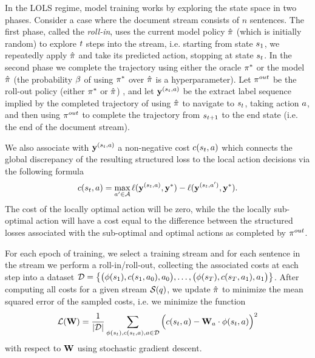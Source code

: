 In the LOLS regime, model training works by exploring the state space in 
two phases. Consider a case where the document stream consists of $n$ 
sentences. The first phase, called 
the \textit{roll-in}, uses the current model policy $\hat{\pi}$ (which
is initially random) to explore $t$ steps into the stream, i.e. starting
from state $s_1$, we repeatedly apply $\hat{\pi}$ and take its 
predicted action, stopping at state $s_t$. 
In the second phase we complete the trajectory using either the oracle 
$\pi^{*}$ or the model $\hat{\pi}$ (the probability $\beta$ of using 
$\pi^{*}$ over $\hat{\pi}$ is a hyperparameter). Let 
$\pi^{out}$ be the roll-out policy (either $\pi^{*}$ or $\hat{\pi}$) , and let 
$\mathbf{y}^{(s_t, a)}$ be the extract label
sequence implied by the completed trajectory of using $\hat{\pi}$
to navigate to $s_t$, taking action $a$, 
and then using $\pi^{out}$ to complete the trajectory from 
$s_{t + 1}$ to the end state (i.e. the end of the document stream).

We also associate with $\mathbf{y}^{(s_t, a)}$
a non-negative cost $c(s_t, a)$ which connects 
the global discrepancy of the resulting structured loss to the local action
decisions via the following formula
\[
    c(s_t, a) = 
      \max_{a^\prime \in \mathcal{A}}
        \ell(
            \mathbf{y}^{(s_t, a)},
            \mathbf{y}^*)
        - 
        \ell(
            \mathbf{y}^{(s_t, a^\prime)},
            \mathbf{y}^*).
\]
The cost of the locally optimal action will be zero, while the 
the locally sub-optimal action will have a cost equal to the difference
between the structured losses associated with the sub-optimal and optimal 
actions as completed by $\pi^{out}$.

For each epoch of training, we select a training stream and for 
each sentence in the stream we perform a roll-in/roll-out, collecting
the associated costs at each step into a dataset
$\mathcal{D} = \big\{\big(\phi(s_1), c(s_1, a_0), a_0\big), \ldots,
\big(\phi(s_T), c(s_T, a_1), a_1\big) \big\}$.
After computing all costs for a given
stream $\mathcal{S}(q)$, we update $\hat{\pi}$ to minimize the mean
squared error of the sampled costs, i.e. we minimize the function
\[ 
    \mathcal{L}(\mathbf{W}) =
    \frac{1}{|\mathcal{D}|} \sum_{\phi(s_t), c(s_t, a), a \in \mathcal{D}}  
\Big( c(s_t, a) -  \mathbf{W}_{a} \cdot \phi(s_t, a) \Big)^2 \]
 with respect to $\mathbf{W}$ using stochastic gradient descent. 

